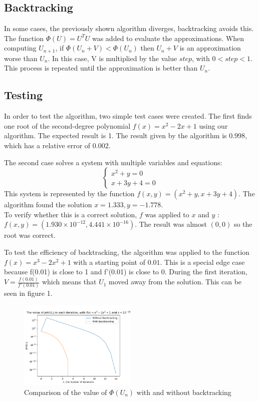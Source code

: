 \documentclass{article}
\begin{document}
\subsection{Backtracking}

In some cases, the previously shown algorithm diverges, backtracking avoids this.
The function $\Phi(U) = U^TU$ was added to evaluate the approximations.
When computing $U_{n+1}$, if $\Phi(U_n + V) < \Phi(U_n)$ then $U_n + V$ is an approximation worse than $U_n$. In this case, V is multiplied by the value $step$, with $0 < step < 1$. This process is repeated until the approximation is better than $U_n$.

\subsection{Testing}

In order to test the algorithm, two simple test cases were created. The first finds one root of the second-degree polynomial $f(x) = x^2 - 2x + 1$ using our algorithm. The expected result is 1. The result given by the algorithm is $0.998$, which has a relative error of $0.002$.

The second case solves a system with multiple variables and equations:
\[\begin{cases}
x^2 + y = 0 \\
x + 3y + 4 = 0
\end{cases}\]
This system is represented by the function $f(x, y) = (x^2 + y, x + 3y + 4)$. The algorithm found the solution $x = 1.333, y = -1.778$.
\\
To verify whether this is a correct solution, $f$ was applied to $x$ and $y$ : $f(x, y) = (1.930 \times 10^{-12}, 4.441 \times 10^{-16})$. The result was almost $(0, 0)$ so the root was correct.

To test the efficiency of backtracking, the algorithm was applied to the function $f(x) = x^3 - 2x^2 + 1$ with a starting point of $0.01$. This is a special edge case because f(0.01) is close to 1 and f'(0.01) is close to 0. During the first iteration, $V = \frac{f(0.01)}{f'(0.01)}$ which means that $U_1$ moved away from the solution. This can be seen in figure 1.

\begin{figure}[!htb]
    \centering
    \includegraphics[width=0.5\textwidth]{backtracking_testing.png}
    \caption{Comparison of the value of $\Phi(U_n)$ with and without backtracking}
\end{figure}
\end{document}
